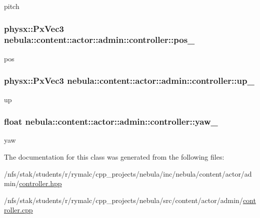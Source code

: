 pitch \hypertarget{classnebula_1_1content_1_1actor_1_1admin_1_1controller_a6024418e033d20bbb4ce9912e01a59da}{
\subsubsection[{pos\_\-}]{\setlength{\rightskip}{0pt plus 5cm}physx::PxVec3 {\bf nebula::content::actor::admin::controller::pos\_\-}}}
\label{classnebula_1_1content_1_1actor_1_1admin_1_1controller_a6024418e033d20bbb4ce9912e01a59da}


pos \hypertarget{classnebula_1_1content_1_1actor_1_1admin_1_1controller_a5e09f81eb05ce73277241d0e1ebdab02}{
\subsubsection[{up\_\-}]{\setlength{\rightskip}{0pt plus 5cm}physx::PxVec3 {\bf nebula::content::actor::admin::controller::up\_\-}}}
\label{classnebula_1_1content_1_1actor_1_1admin_1_1controller_a5e09f81eb05ce73277241d0e1ebdab02}


up \hypertarget{classnebula_1_1content_1_1actor_1_1admin_1_1controller_ac38bfc8b00f66b3849706bb1ef21db44}{
\subsubsection[{yaw\_\-}]{\setlength{\rightskip}{0pt plus 5cm}float {\bf nebula::content::actor::admin::controller::yaw\_\-}}}
\label{classnebula_1_1content_1_1actor_1_1admin_1_1controller_ac38bfc8b00f66b3849706bb1ef21db44}


yaw 

The documentation for this class was generated from the following files:\begin{DoxyCompactItemize}
\item 
/nfs/stak/students/r/rymalc/cpp\_\-projects/nebula/inc/nebula/content/actor/admin/\hyperlink{admin_2controller_8hpp}{controller.hpp}\item 
/nfs/stak/students/r/rymalc/cpp\_\-projects/nebula/src/content/actor/admin/\hyperlink{admin_2controller_8cpp}{controller.cpp}\end{DoxyCompactItemize}
